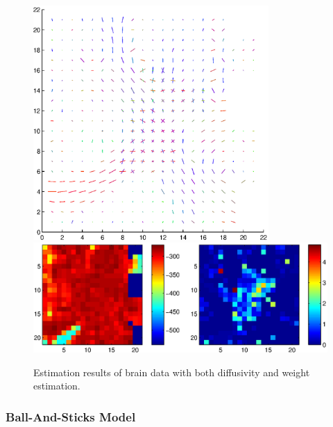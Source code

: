 \documentclass{article}
\begin{document}
\begin{figure}[H]
  \caption{Estimation results of brain data with both diffusivity and weight estimation.}
  \centering
  \includegraphics[width=0.8\textwidth]{figures/brain_modbas_weights_diffus_dir.eps}
  \includegraphics[width=\textwidth]{figures/brain_modbas_weights_diffus_like.eps}
\end{figure}

\subsubsection{Ball-And-Sticks Model}
\end{document}
